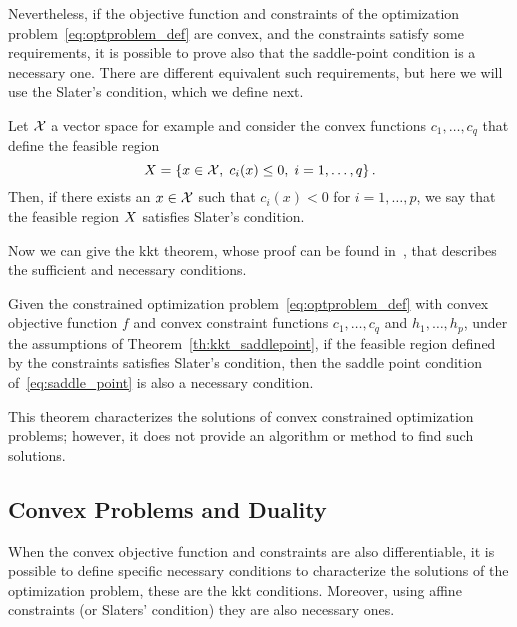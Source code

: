 Nevertheless, if the objective function and constraints of the optimization problem~\eqref{eq:optproblem_def} are convex, and the constraints satisfy some requirements, it is possible to prove also that the saddle-point condition is a necessary one.
There are different equivalent such requirements, but here we will use the Slater's condition, which we define next.
\begin{definition}
    Let $\mathcal{X}$ a vector space for example and consider the convex functions $c_1, \ldots, c_q$ that define the feasible region
    \begin{equation}
        X = \left\{x \in \mathcal{X}, \; c_i(x) \leq 0, \; i=1, \ldots, q\right\} .
    \end{equation}  
    Then, if there exists an $x \in \mathcal{X}$ such that $c_i(x) < 0$ for $i=1, \ldots, p$, we say that the feasible region $X$ satisfies Slater's condition.       
\end{definition}
Now we can give the \acrshort{kkt} theorem, whose proof can be found in~\citet{ScholkopfS02}, that describes the sufficient and necessary conditions.
\begin{theorem}
    Given the constrained optimization problem~\eqref{eq:optproblem_def} with convex objective function $f$ and convex constraint functions $c_1, \ldots, c_q$ and $h_1, \ldots, h_p$, 
    under the assumptions of Theorem~\ref{th:kkt_saddlepoint}, if the feasible region defined by the constraints satisfies Slater's condition, then the saddle point condition of~\eqref{eq:saddle_point} is also a necessary condition.
\end{theorem}
This theorem characterizes the solutions of convex constrained optimization problems; however, it does not provide an algorithm or method to find such solutions.

\subsection{Convex Problems and Duality}
When the convex objective function and constraints are also differentiable, it is possible to define specific necessary conditions to characterize the solutions of the optimization problem, these are the \acrshort{kkt} conditions. Moreover, using affine constraints (or Slaters' condition) they are also necessary ones.

